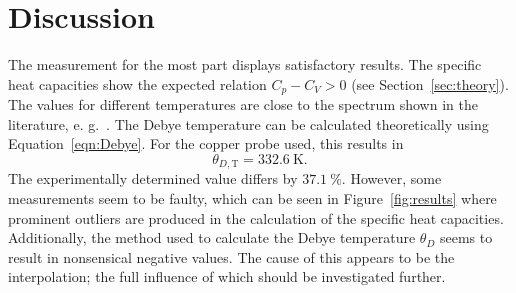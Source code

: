\section{Discussion}
The measurement for the most part displays satisfactory results. The specific heat
capacities show the expected relation $C_{p} - C_{V} > 0$ (see Section~\ref{sec:theory}).
The values for different temperatures are close to the spectrum shown in the literature, e. g.~\cite{Arblaster2015}.
The Debye temperature can be calculated theoretically using Equation~\ref{eqn:Debye}.
For the copper probe used, this results in
\begin{equation}
 \theta_{D, \mathrm{T}} = \SI{332.6}{\kelvin}.
\end{equation}
The experimentally determined value differs by $\SI{37.1}{\percent}$.
However, some measurements seem to be faulty, which can be seen in Figure~\ref{fig:results} where
prominent outliers are produced in the calculation of the specific heat capacities.
Additionally, the method used to calculate the Debye temperature $\theta_{D}$ seems to result in nonsensical negative
values. The cause of this appears to be the interpolation; the full influence of which should be investigated further.
